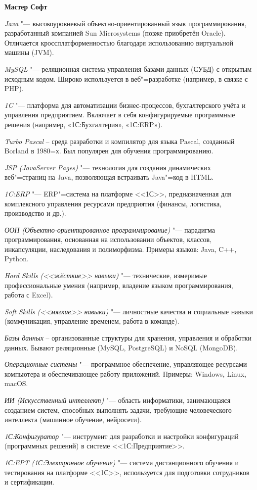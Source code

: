 \documentclass{article}
\begin{document}
\begin{center}
    \textbf{Мастер Софт}
\end{center}

\textit{Java} "--- высокоуровневый объектно-ориентированный язык программирования, разработанный компанией Sun Microsystems (позже приобретён Oracle). Отличается кроссплатформенностью благодаря использованию виртуальной машины (JVM).  

\textit{MySQL} "--- реляционная система управления базами данных (СУБД) с открытым исходным кодом. Широко используется в веб"=разработке (например, в связке с PHP).  

\textit{1C} "--- платформа для автоматизации бизнес-процессов, бухгалтерского учёта и управления предприятием. Включает в себя конфигурируемые программные решения (например, «1С:Бухгалтерия», «1С:ERP»).  

\textit{Turbo Pascal} – среда разработки и компилятор для языка Pascal, созданный Borland в 1980=х. Был популярен для обучения программированию.  

\textit{JSP (JavaServer Pages)} "--- технология для создания динамических веб"=страниц на Java, позволяющая встраивать Java"=код в HTML.  

\textit{1C:ERP} "--- ERP"=система на платформе <<1С>>, предназначенная для комплексного управления ресурсами предприятия (финансы, логистика, производство и др.).  

\textit{ООП (Объектно-ориентированное программирование)} "--- парадигма программирования, основанная на использовании объектов, классов, инкапсуляции, наследования и полиморфизма. Примеры языков: Java, C++, Python.  

\textit{Hard Skills (<<жёсткие>> навыки)} "--- технические, измеримые профессиональные умения (например, владение языком программирования, работа с Excel).  

\textit{Soft Skills (<<мягкие>> навыки)} "--- личностные качества и социальные навыки (коммуникация, управление временем, работа в команде).  

\textit{Базы данных} – организованные структуры для хранения, управления и обработки данных. Бывают реляционные (MySQL, PostgreSQL) и NoSQL (MongoDB).  

\textit{Операционные системы} "--- программное обеспечение, управляющее ресурсами компьютера и обеспечивающее работу приложений. Примеры: Windows, Linux, macOS.  

\textit{ИИ (Искусственный интеллект)} "--- область информатики, занимающаяся созданием систем, способных выполнять задачи, требующие человеческого интеллекта (машинное обучение, нейросети).  

\textit{1С:Конфигуратор} "--- инструмент для разработки и настройки конфигураций (программных решений) в системе <<1С:Предприятие>>.  

\textit{1С:EPT (1С:Электронное обучение)} "--- система дистанционного обучения и тестирования на платформе <<1С>>, используется для подготовки сотрудников и сертификации.  
\end{document}

